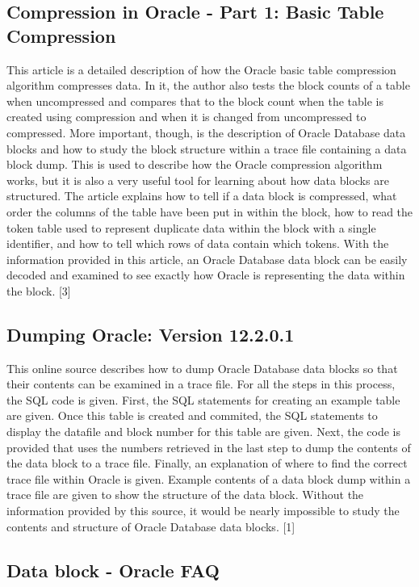 \documentclass[10pt]{article}
\begin{document}
\subsection{Compression in Oracle - Part 1: Basic Table Compression}

This article is a detailed description of how the Oracle basic table compression algorithm compresses data. 
In it, the author also tests the block counts of a table when uncompressed and compares that to the block count when the table is created using compression and when it is changed from uncompressed to compressed. 
More important, though, is the description of Oracle Database data blocks and how to study the block structure within a trace file containing a data block dump.
This is used to describe how the Oracle compression algorithm works, but it is also a very useful tool for learning about how data blocks are structured. 
The article explains how to tell if a data block is compressed, what order the columns of the table have been put in within the block, how to read the token table used to represent duplicate data within the block with a single identifier, and how to tell which rows of data contain which tokens.
With the information provided in this article, an Oracle Database data block can be easily decoded and examined to see exactly how Oracle is representing the data within the block. [3]

\subsection{Dumping Oracle: Version 12.2.0.1}

This online source describes how to dump Oracle Database data blocks so that their contents can be examined in a trace file.
For all the steps in this process, the SQL code is given.
First, the SQL statements for creating an example table are given. 
Once this table is created and commited, the SQL statements to display the datafile and block number for this table are given.
Next, the code is provided that uses the numbers retrieved in the last step to dump the contents of the data block to a trace file. 
Finally, an explanation of where to find the correct trace file within Oracle is given. 
Example contents of a data block dump within a trace file are given to show the structure of the data block. 
Without the information provided by this source, it would be nearly impossible to study the contents and structure of Oracle Database data blocks. [1]

\subsection{Data block - Oracle FAQ}
\end{document}
